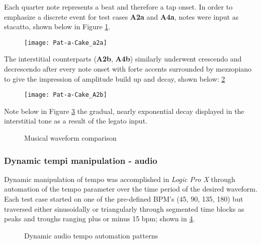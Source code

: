 Each quarter note represents a beat and therefore a tap onset. In order to emphasize a discrete event for test cases \textbf{A2a} and \textbf{A4a}, notes were input as stacatto, shown below in Figure \ref{fig:patacakea2a}.

\begin{figure}[H]
    \centering
    \texttt{[image: Pat-a-Cake\_a2a]}
    \label{fig:patacakea2a}
\end{figure}

The interstitial counterparts (\textbf{A2b}, \textbf{A4b}) similarly underwent crescendo and decrescendo after every note onset with forte accents surrounded by mezzopiano to give the impression of amplitude build up and decay, shown below: \ref{fig:pat-a-cake_a2b} 

\begin{figure}[H]
    \centering
    \texttt{[image: Pat-a-Cake\_A2b]}
    \label{fig:pat-a-cake_a2b}
\end{figure}

Note below in Figure \ref{fig:music_comparison} the gradual, nearly exponential decay displayed in the interstitial tone as a result of the legato input.

\begin{figure}[H]
    \centering
    \caption{Musical waveform comparison}
        \qquad
    \label{fig:music_comparison}
\end{figure}

\subsubsection{Dynamic tempi manipulation - audio}
Dynamic manipulation of tempo was accomplished in \textit{Logic Pro X} through automation of the tempo parameter over the time period of the desired waveform. Each test case started on one of the pre-defined BPM's (45, 90, 135, 180) but traversed either sinusoidally or triangularly through segmented time blocks as peaks and troughs ranging plus or minus 15 bpm; shown in \ref{fig:dynamic_audio}.

\begin{figure}[H]
    \centering
    \caption{Dynamic audio tempo automation patterns}
        \qquad
    \label{fig:dynamic_audio}
\end{figure}

